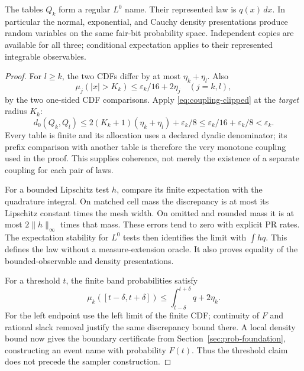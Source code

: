\begin{theorem}
\label{thm:density-realization}
The tables $Q_k$ form a regular $L^0$ name. Their represented law is $q(x)\,dx$.
In particular the normal, exponential, and Cauchy density presentations
produce random variables on the same fair-bit probability space. Independent
copies are available for all three; conditional expectation applies to their
represented integrable observables.
\end{theorem}
\begin{proof}
For $l\ge k$, the two CDFs differ by at most $\eta_k+\eta_l$. Also
\[
 \mu_j(|x|>K_k)\le\varepsilon_k/16+2\eta_j
 \quad(j=k,l),
\]
by the two one-sided CDF comparisons. Apply
\eqref{eq:coupling-clipped} at the \emph{target} radius $K_k$:
\[
 d_0(Q_k,Q_l)
 \le 2(K_k+1)(\eta_k+\eta_l)+\varepsilon_k/8
 \le\varepsilon_k/16+\varepsilon_k/8
 <\varepsilon_k.
\]
Every table is finite and its allocation uses a declared dyadic denominator;
its prefix comparison with another table is therefore the very monotone
coupling used in the proof. This supplies coherence, not merely the existence
of a separate coupling for each pair of laws.

For a bounded Lipschitz test $h$, compare its finite expectation with the
quadrature integral. On matched cell mass the discrepancy is at most its
Lipschitz constant times the mesh width. On omitted and rounded mass it is
at most $2\|h\|_\infty$ times that mass. These errors tend to zero with
explicit PR rates. The expectation stability for $L^0$ tests then identifies
the limit with $\int hq$. This defines the law without a measure-extension
oracle. It also proves equality of the bounded-observable and density
presentations.

For a threshold $t$, the finite band probabilities satisfy
\[
 \mu_k([t-\delta,t+\delta])
 \le\int_{t-\delta}^{t+\delta}q+2\eta_k.
\]
For the left endpoint use the left limit of the finite CDF; continuity of
$F$ and rational slack removal justify the same discrepancy bound there.
A local density bound now gives the boundary certificate from
Section~\ref{sec:prob-foundation}, constructing an event name with probability
$F(t)$. Thus the threshold claim does not precede the sampler construction.
\end{proof}

